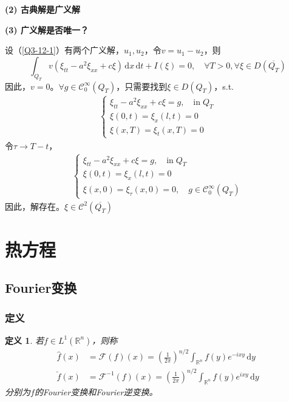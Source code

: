 \documentclass[11pt, a4paper]{article}
\theoremstyle{theorem}
\newtheorem{definition}[thm]{定义}
\newcommand{\intd}[1]{\,\mathrm{d}{#1}}
\begin{document}
\textbf{(2) 古典解是广义解}

\textbf{(3) 广义解是否唯一？}

设（\ref{Q3-12-1}）有两个广义解，$u_1, u_2$，令$v = u_1 - u_2$，则
$$
\int_{Q_T} v(\xi_{tt} - a^2 \xi_{xx} + c \xi) \intd x \intd t + I(\xi) = 0, \quad \forall T > 0, \forall \xi \in  D(\overline{Q_T})
$$
因此，$v = 0$。$\forall g \in \mathcal{C}_0^\infty(Q_T)$，只需要找到$\xi \in D(Q_T)$，s.t.
\begin{align*}
    \begin{cases}
    \xi_{tt} - a^2 \xi_{xx} + c \xi = g, \quad \text{in} \; Q_T \\
    \xi(0,t) = \xi_x(l,t) = 0 \\
    \xi(x,T) = \xi_t(x,T) = 0
    \end{cases}
\end{align*}
令$\tau \rightarrow T - t$，
\begin{align*}
  \begin{cases}
    \xi_{tt} - a^2 \xi_{xx} + c \xi = g, \quad \text{in} \; Q_T \\
    \xi(0,t) = \xi_x(l,t) = 0 \\
    \xi(x,0) = \xi_\tau(x,0) = 0, \quad g \in \mathcal{C}_0^\infty(Q_T)
  \end{cases}
\end{align*}
因此，解存在。$\xi \in \mathcal{C}^2(\overline{Q_T})$

\newpage

\section{热方程}

\subsection{Fourier变换}

\subsubsection{定义}

\begin{definition}
  若$f \in L^1(\mathbb{R}^n)$，则称
\begin{align}
    \hat{f}(x) &= \mathcal{F}(f)(x) = \left(\frac{1}{2\pi}\right)^{n/2} \int_{\mathbb{R}^n} f(y) e^{-ixy} \intd y \\
    \breve{f}(x) &= \mathcal{F}^{-1}(f)(x) = \left(\frac{1}{2\pi}\right)^{n/2} \int_{\mathbb{R}^n} f(y) e^{ixy} \intd y
\end{align}
分别为$f$的Fourier变换和Fourier逆变换。
\end{definition}
\end{document}
